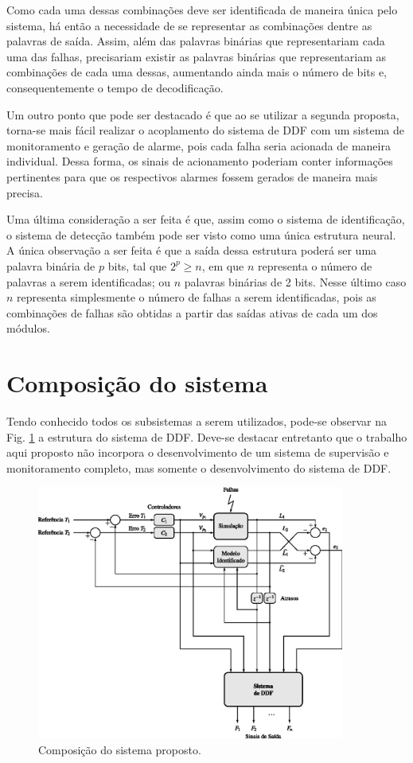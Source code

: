 Como cada uma dessas combinações deve ser identificada de maneira única pelo
sistema, há então a necessidade de se representar as combinações dentre as
palavras de saída. Assim, além das palavras binárias que representariam cada uma
das falhas, precisariam existir as palavras binárias que representariam as
combinações de cada uma dessas, aumentando ainda mais o número de bits e,
consequentemente o tempo de decodificação.

Um outro ponto que pode ser destacado é que ao se utilizar a segunda proposta,
torna-se mais fácil realizar o acoplamento do sistema de DDF com um sistema de
monitoramento e geração de alarme, pois cada falha seria acionada de maneira
individual. Dessa forma, os sinais de acionamento poderiam conter informações
pertinentes para que os respectivos alarmes fossem gerados de maneira mais
precisa.

Uma última consideração a ser feita é que, assim como o sistema de
identificação, o sistema de detecção também pode ser visto como uma única
estrutura neural. A única observação a ser feita é que a saída dessa estrutura
poderá ser uma palavra binária de $p$ bits, tal que $2^p \geq n$, em que $n$
representa o número de palavras a serem identificadas; ou $n$ palavras binárias
de 2 bits. Nesse último caso $n$ representa simplesmente o número de falhas a
serem identificadas, pois as combinações de falhas são obtidas a partir das
saídas ativas de cada um dos módulos.

\section{Composição do sistema}
Tendo conhecido todos os subsistemas a serem utilizados, pode-se observar na
Fig. \ref{fig:composicao} a estrutura do sistema de DDF. Deve-se destacar
entretanto que o trabalho aqui proposto não incorpora o desenvolvimento de um
sistema de supervisão e monitoramento completo, mas somente o desenvolvimento do
sistema de DDF.

\begin{figure}[htb]
\centering
    \includegraphics[width=0.9\textwidth]{imgs/sistema/eps/composicao}
    \caption{Composição do sistema proposto.}
    \label{fig:composicao}
\end{figure}

